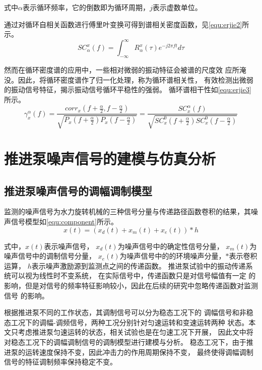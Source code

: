 式中$\alpha$表示循环频率，它的倒数即为循环周期，$j$表示虚数单位。

通过对循环自相关函数进行傅里叶变换可得到谱相关密度函数，见\autoref{equ:erjie2}所示。
\begin{equation}
    \label{equ:erjie2}
    SC_{\alpha }^{x} \left ( f  \right ) =\int_{-\infty }^{\infty } R_{\alpha }^{x}\left ( \tau  \right )  e^{-j2\pi f t} d\tau   
\end{equation}

然而在循环密度谱的应用中，一些相对微弱的振动特征会被谱的尺度效
应所淹没。因此，将循环密度谱作了归一化处理，称为循环谱相关性，
有效检测出微弱的振动信号特征，揭示振动信号循环平稳性的强弱。
循环谱相干性如\autoref{equ:erjie3}所示。
\begin{equation}
    \label{equ:erjie3}
    \gamma _{x}^{\alpha}\left ( f \right ) =\frac{corr_{x}\left ( f+\frac{\alpha }{2}, f-\frac{\alpha }{2} \right )  }{\sqrt{P_{x}\left ( f+\frac{\alpha }{2} \right )P_{x}\left ( f-\frac{\alpha }{2} \right ) } } =\frac{SC_{x}^{\alpha }\left ( f \right )  }{\sqrt{SC_{x}^{0} \left ( f+\frac{\alpha }{2} \right )SC_{x}^{0} \left ( f-\frac{\alpha }{2} \right )} }  
\end{equation}

\section{推进泵噪声信号的建模与仿真分析}
\subsection{推进泵噪声信号的调幅调制模型}
监测的噪声信号为水力旋转机械的三种信号分量与传递路径函数卷积的结果，其噪声信号模型如\autoref{equ:component}所示。 
\begin{equation}
    \label{equ:component}
    x\left ( t \right ) =\left ( x_d\left ( t \right )+x_m\left ( t \right )+x_e\left ( t \right ) \right )\ast h 
\end{equation}

式中，$x\left ( t \right )$表示噪声信号，
$x_d\left ( t \right )$为噪声信号中的确定性信号分量，
$x_m\left ( t \right )$为噪声信号中的调制信号分量，
$x_e\left ( t \right )$为噪声信号中的的环境噪声分量，$\ast$表示卷积运算，
$h$表示噪声激励源到监测点之间的传递函数。 
推进泵试验中的振动传递系统可以视为线性时不变系统，
在实际信号中，传递函数只是对信号幅值有一定
的影响，但是对信号的频率特征影响较小，因此在后续的研究中忽略传递函数对监测信号
的影响。 

根据推进泵不同的工作状态，其调制信号可以分为稳态工况下的
调幅信号和非稳态工况下的调幅-调频信号，两种工况分别针对匀速运转和变速运转两种
状态。本文只考虑推进泵匀速运转的状态，相关试验也是在匀速工况下开展，
因此文中将对稳态工况下的调幅调制信号的调制模型进行建模与分析。 
稳态工况下，由于推进泵的运转速度保持不变，因此冲击力的作用周期保持不变，
最终使得调幅调制信号的特征调制频率保持稳定不变。

